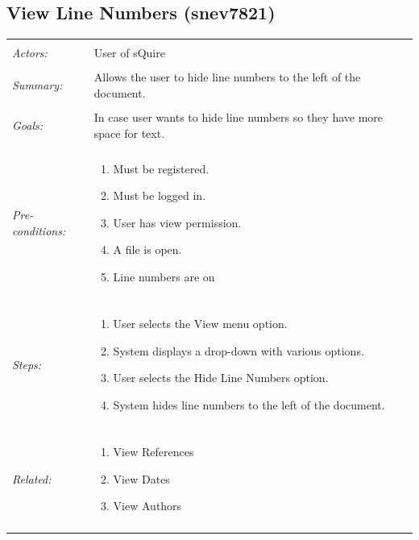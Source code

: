 \documentclass[11pt]{report}
\begin{document}
\subsection{View Line Numbers (snev7821)}
\begin{tabular}{ p{2cm} p{12cm} }
\hline
\\
	\textit{Actors:} & User of sQuire \\
	\\
	\textit{Summary:} & Allows the user to hide line numbers to the left of the document. \\
	\\
	\textit{Goals:} & In case user wants to hide line numbers so they have more space for text.\\
	\\
	\textit{Pre-conditions:} & \begin{enumerate}
		\item Must be registered.
		\item Must be logged in.
		\item User has view permission.
		\item A file is open.
		\item Line numbers are on
	\end{enumerate} \\
	\\
	\textit{Steps:} & \begin{enumerate}
		\item User selects the View menu option.
		\item System displays a drop-down with various options.
		\item User selects the Hide Line Numbers option.
		\item System hides line numbers to the left of the document.
	\end{enumerate} \\
	\\
	\textit{Related:} & \begin{enumerate}
		\item View References
		\item View Dates
		\item View Authors
	\end{enumerate} \\
	\\
\hline
\end{tabular}
\newpage
\end{document}
